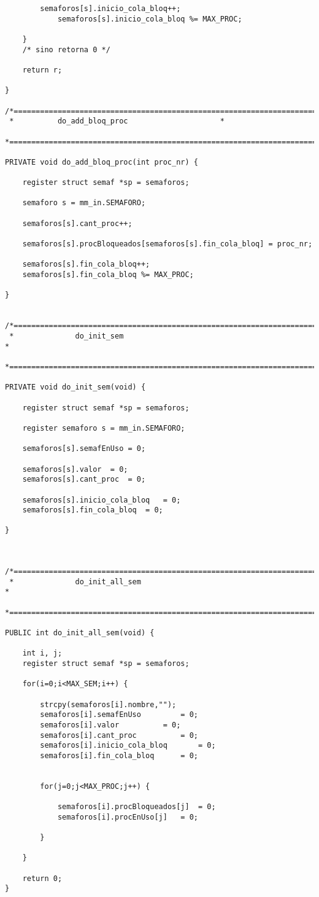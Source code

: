 \begin{verbatim}
		semaforos[s].inicio_cola_bloq++;
    		semaforos[s].inicio_cola_bloq %= MAX_PROC;

	}
	/* sino retorna 0 */

	return r;

}

/*===========================================================================*
 *			do_add_bloq_proc				     *
 *===========================================================================*/

PRIVATE void do_add_bloq_proc(int proc_nr) {

	register struct semaf *sp = semaforos;

	semaforo s = mm_in.SEMAFORO;

	semaforos[s].cant_proc++;

	semaforos[s].procBloqueados[semaforos[s].fin_cola_bloq] = proc_nr;

	semaforos[s].fin_cola_bloq++;
	semaforos[s].fin_cola_bloq %= MAX_PROC;

}


/*===========================================================================*
 *				do_init_sem				   									 *
 *===========================================================================*/

PRIVATE void do_init_sem(void) {

	register struct semaf *sp = semaforos;

	register semaforo s = mm_in.SEMAFORO;

	semaforos[s].semafEnUso = 0;

	semaforos[s].valor 	= 0;
	semaforos[s].cant_proc 	= 0;

	semaforos[s].inicio_cola_bloq	= 0;
	semaforos[s].fin_cola_bloq	= 0;

}



/*===========================================================================*
 *				do_init_all_sem											     *
 *===========================================================================*/

PUBLIC int do_init_all_sem(void) {

	int i, j;
	register struct semaf *sp = semaforos;

	for(i=0;i<MAX_SEM;i++) {

		strcpy(semaforos[i].nombre,"");
		semaforos[i].semafEnUso			= 0;
		semaforos[i].valor 			= 0;
		semaforos[i].cant_proc 			= 0;
		semaforos[i].inicio_cola_bloq		= 0;
		semaforos[i].fin_cola_bloq		= 0;


		for(j=0;j<MAX_PROC;j++) {

			semaforos[i].procBloqueados[j]	= 0;
			semaforos[i].procEnUso[j] 	= 0;

		}

	}

	return 0;
}
\end{verbatim}
